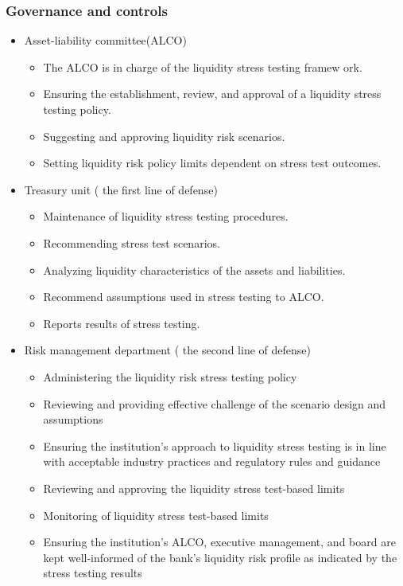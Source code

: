 \subsubsection{Governance and controls}
\begin{itemize}
\item Asset-liability committee(ALCO)
    \begin{itemize}
    \item The ALCO is in charge of the liquidity stress testing framew ork.
    \item Ensuring the establishment, review, and approval of a liquidity stress testing policy.
    \item Suggesting and approving liquidity risk scenarios.
    \item Setting liquidity risk policy limits dependent on stress test outcomes.
    \end{itemize}
\item Treasury unit ( the first line of defense)
    \begin{itemize}
    \item Maintenance of liquidity stress testing procedures.
    \item Recommending stress test scenarios.
    \item Analyzing liquidity characteristics of the assets and liabilities.
    \item Recommend assumptions used in stress testing to ALCO.
    \item Reports results of stress testing.
    \end{itemize}
\item Risk management department ( the second line of defense)
    \begin{itemize}
    \item Administering the liquidity risk stress testing policy
    \item Reviewing and providing effective challenge of the scenario design and assumptions
    \item Ensuring the institution's approach to liquidity stress testing is in line with acceptable industry practices and regulatory rules and guidance
    \item Reviewing and approving the liquidity stress test-based limits
    \item Monitoring of liquidity stress test-based limits
    \item Ensuring the institution's ALCO, executive management, and board are kept well-informed of the bank's liquidity risk profile as indicated by the stress testing results

\end{itemize}
\end{itemize}
